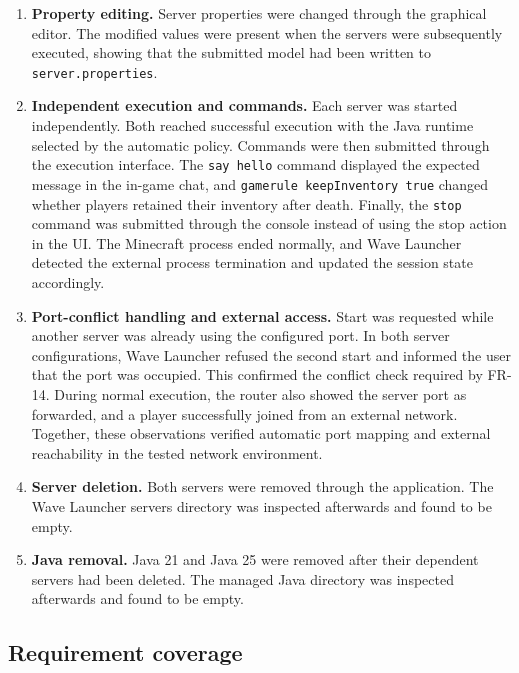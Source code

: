 \begin{enumerate}
  \item \textbf{Property editing.} Server properties were changed through the graphical editor. The modified values were present when the servers were subsequently executed, showing that the submitted model had been written to \texttt{server.properties}.

  \item \textbf{Independent execution and commands.} Each server was started independently. Both reached successful execution with the Java runtime selected by the automatic policy. Commands were then submitted through the execution interface. The \texttt{say hello} command displayed the expected message in the in-game chat, and \texttt{gamerule keepInventory true} changed whether players retained their inventory after death. Finally, the \texttt{stop} command was submitted through the console instead of using the stop action in the UI. The Minecraft process ended normally, and Wave Launcher detected the external process termination and updated the session state accordingly.

  \item \textbf{Port-conflict handling and external access.} Start was requested while another server was already using the configured port. In both server configurations, Wave Launcher refused the second start and informed the user that the port was occupied. This confirmed the conflict check required by FR-14. During normal execution, the router also showed the server port as forwarded, and a player successfully joined from an external network. Together, these observations verified automatic port mapping and external reachability in the tested network environment.

  \item \textbf{Server deletion.} Both servers were removed through the application. The Wave Launcher servers directory was inspected afterwards and found to be empty.

  \item \textbf{Java removal.} Java 21 and Java 25 were removed after their dependent servers had been deleted. The managed Java directory was inspected afterwards and found to be empty.
\end{enumerate}

\subsection{Requirement coverage}

